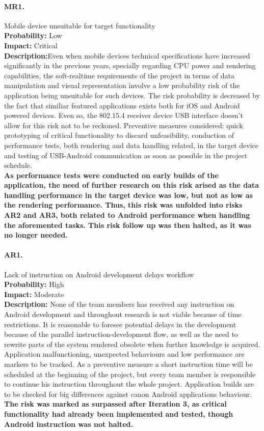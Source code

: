 		\paragraph{MR1.}Mobile device unsuitable for target functionality\\
		\textbf{Probability:} Low\\
		\textbf{Impact:} Critical\\
		\textbf{Description:}Even when mobile devices technical specifications have increased significantly in the previous years, specially regarding CPU power and rendering capabilities, the soft-realtime requirements of the project in terms of data manipulation and visual representation involve a low probability risk of the application being unsuitable for such devices. The risk probability is decreased by the fact that similiar featured applications exists both for iOS and Android powered devices. Even so, the 802.15.4 receiver device USB interface doesn't allow for this risk not to be reckoned.
		Preventive measures considered: quick prototyping of critical functionality to discard  unfeasibility, conduction of performance tests, both rendering and data handling related, in the target device and testing of USB-Android communication as soon as possible in the project schedule.\\
		\textbf{As performance tests were conducted on early builds of the application, the need of further research on this risk arised as the data handling performance in the target device was low, but not as low as the rendering performance. Thus, this risk was unfolded into risks AR2 and AR3, both related to Android performance when handling the aforemented tasks. This risk follow up was then halted, as it was no longer needed.}

		\paragraph{AR1.}Lack of instruction on Android development delays workflow\\
		\textbf{Probability:} High\\
		\textbf{Impact:} Moderate\\
		\textbf{Description:} None of the team members has received any instruction on Android development and throughout research is not viable because of time restrictions. It is reasonable to foresee potential delays in the development because of the parallel instruction-development flow, as well as the need to rewrite parts of the system rendered obsolete when further knowledge is acquired.
		Application malfunctioning, unexpected behaviours and low performance are markers to be tracked.
		As a preventive measure a short instruction time will be scheduled at the beginning of the project, but every team member is responsible to continue his instruction throughout the whole project. Application builds are to be checked for big differences against canon Android applications behaviour.\\
		\textbf{The risk was marked as surpassed after Iteration 3, as critical functionality had already been implemented and tested, though Android instruction was not halted.}

